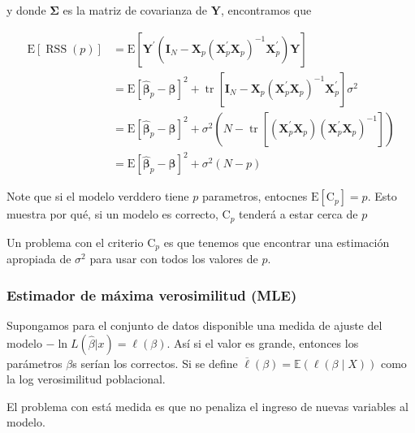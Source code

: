 \documentclass[
  12pt,
]{book}
\begin{document}
y donde \(\boldsymbol{\Sigma}\) es la matriz de covarianza de
\(\mathbf{Y}\), encontramos que

\begin{equation*}
\begin{aligned}
\mathrm{E}[\operatorname{RSS}(p)] &=\mathrm{E}\left[\mathbf{Y}^{\prime}\left(\mathbf{I}_{N}-\mathbf{X}_{p}\left(\mathbf{X}_{p}^{\prime} \mathbf{X}_{p}\right)^{-1} \mathbf{X}_{p}^{\prime}\right) \mathbf{Y}\right] \\
&=\mathrm{E}\left[\hat{\boldsymbol{\beta}}_{p}-\boldsymbol{\beta}\right]^{2}+\operatorname{tr}\left[\mathbf{I}_{N}-\mathbf{X}_{p}\left(\mathbf{X}_{p}^{\prime} \mathbf{X}_{p}\right)^{-1} \mathbf{X}_{p}^{\prime}\right] \sigma^{2} \\
&=\mathrm{E}\left[\hat{\boldsymbol{\beta}}_{p}-\boldsymbol{\beta}\right]^{2}+\sigma^{2}\left(N-\operatorname{tr}\left[\left(\mathbf{X}_{p}^{\prime} \mathbf{X}_{p}\right)\left(\mathbf{X}_{p}^{\prime} \mathbf{X}_{p}\right)^{-1}\right]\right) \\
&=\mathrm{E}\left[\hat{\boldsymbol{\beta}}_{p}-\boldsymbol{\beta}\right]^{2}+\sigma^{2}(N-p)
\end{aligned}
\end{equation*}

Note que si el modelo verddero tiene \(p\) parametros, entocnes
\(\mathrm{E}\left[\mathrm{C}_{p}\right]=p\). Esto muestra por qué, si un
modelo es correcto, \(\mathrm{C}_{p}\) tenderá a estar cerca de \(p\)

Un problema con el criterio \(\mathrm{C}_{p}\) es que tenemos que
encontrar una estimación apropiada de \(\sigma^{2}\) para usar con todos
los valores de \(p\).

\hypertarget{estimador-de-muxe1xima-verosimilitud-mle}{%
\subsubsection{Estimador de máxima verosimilitud
(MLE)}\label{estimador-de-muxe1xima-verosimilitud-mle}}

Supongamos para el conjunto de datos disponible una medida de ajuste del
modelo \(-\ln L(\hat{\beta} | x)=\ell(\beta)\). Así si el valor es
grande, entonces los parámetros \(\beta\)s serían los correctos. Si se
define \(\overline{\ell}(\beta)=\mathbb{E}(\ell(\beta\mid X))\) como la
log verosimilitud poblacional.

El problema con está medida es que no penaliza el ingreso de nuevas
variables al modelo.
\end{document}
